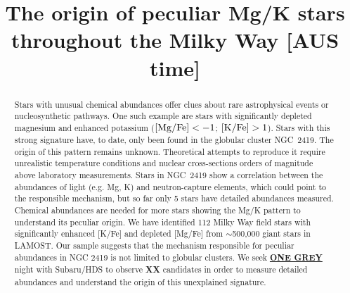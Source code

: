 \documentclass{article}
\begin{document}
\newcommand{\todo}[1]{\ul{\MakeUppercase{\textbf{#1}}}}

\semester{}
\proposalid{}
\receivedate{}


\title{The origin of peculiar Mg/K stars throughout the Milky Way [AUS time] }


\NormalStars

\begin{abstract}
Stars with unusual chemical abundances offer clues about rare astrophysical events or nucleosynthetic pathways. One such example are stars with significantly depleted magnesium and enhanced potassium ($[{\rm Mg/Fe}] < -1$; $[{\rm K/Fe}] > 1$). Stars with this strong signature have, to date, only been found in the globular cluster NGC~2419. The origin of this pattern remains unknown. Theoretical attempts to reproduce it require unrealistic temperature conditions and nuclear cross-sections orders of magnitude above laboratory measurements. Stars in NGC~2419 show a correlation between the abundances of light (e.g. Mg, K) and neutron-capture elements, which could point to the responsible mechanism, but so far only 5 stars have detailed abundances measured. Chemical abundances are needed for more stars showing the Mg/K pattern to understand its peculiar origin. We have identified 112 Milky Way field stars with significantly enhanced [K/Fe] and depleted [Mg/Fe] from $\sim$500,000 giant stars in LAMOST. Our sample suggests that the mechanism responsible for peculiar abundances in NGC 2419 is not limited to globular clusters. We seek \todo{one grey} night with Subaru/HDS to observe \textbf{XX} candidates in order to measure detailed abundances and understand the origin of this unexplained signature.
\end{abstract}
\end{document}
